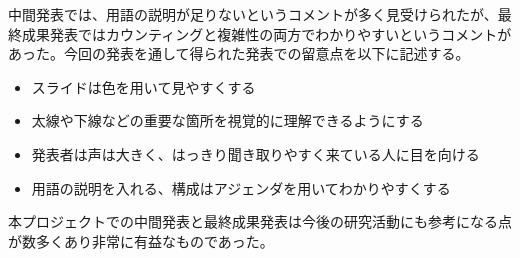 中間発表では、用語の説明が足りないというコメントが多く見受けられたが、最終成果発表ではカウンティングと複雑性の両方でわかりやすいというコメントがあった。今回の発表を通して得られた発表での留意点を以下に記述する。
\begin{itemize}
\item スライドは色を用いて見やすくする
\item 太線や下線などの重要な箇所を視覚的に理解できるようにする
\item 発表者は声は大きく、はっきり聞き取りやすく来ている人に目を向ける
\item 用語の説明を入れる、構成はアジェンダを用いてわかりやすくする
\end{itemize}

本プロジェクトでの中間発表と最終成果発表は今後の研究活動にも参考になる点が数多くあり非常に有益なものであった。
